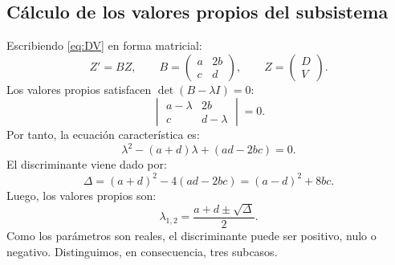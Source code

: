 \documentclass[10pt,letterpaper]{article}
\newcommand{\mat}[1]{\begin{pmatrix}#1\end{pmatrix}}
\begin{document}
\subsection{Cálculo de los valores propios del subsistema}
Escribiendo \eqref{eq:DV} en forma matricial:
\begin{equation}\label{eq:B}
Z'=BZ,\qquad B=\mat{a&2b\\c&d},\qquad Z=\mat{D\\V}.
\end{equation}
Los valores propios satisfacen $\det(B-\lambda I)=0$:
\begin{equation}
\begin{vmatrix}a-\lambda&2b\\c&d-\lambda\end{vmatrix}=0.
\end{equation}
Por tanto, la ecuación característica es:
\begin{equation}\label{eq:char2}
\boxed{\lambda^2-(a+d)\lambda+(ad-2bc)=0.}
\end{equation}
El discriminante viene dado por:
\begin{equation}\label{eq:disc}
\boxed{\Delta=(a+d)^2-4(ad-2bc)=(a-d)^2+8bc.}
\end{equation}
Luego, los valores propios son:
\begin{equation}\label{eq:lambdas}
\boxed{\lambda_{1,2}=\frac{a+d\pm\sqrt{\Delta}}{2}.}
\end{equation}
Como los parámetros son reales, el discriminante puede ser positivo, nulo o negativo. Distinguimos, en consecuencia, tres subcasos.
\end{document}
